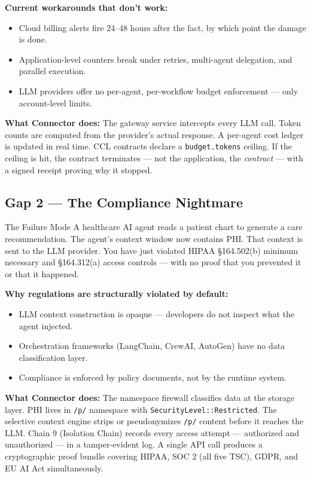 \documentclass[11pt,a4paper]{article}
\begin{document}
\textbf{Current workarounds that don't work:}
\begin{itemize}
  \item Cloud billing alerts fire 24--48 hours after the fact, by which point the damage is done.
  \item Application-level counters break under retries, multi-agent delegation, and parallel execution.
  \item LLM providers offer no per-agent, per-workflow budget enforcement — only account-level limits.
\end{itemize}

\textbf{What Connector does:} The gateway service intercepts every LLM call. Token counts are computed from
the provider's actual response. A per-agent cost ledger is updated in real time. CCL contracts declare a
\texttt{budget.tokens} ceiling. If the ceiling is hit, the contract terminates — not the application, the
\emph{contract} — with a signed receipt proving why it stopped.

\subsection{Gap 2 — The Compliance Nightmare}

\begin{dangerbox}{The Failure Mode}
A healthcare AI agent reads a patient chart to generate a care recommendation. The agent's context window
now contains PHI. That context is sent to the LLM provider. You have just violated HIPAA §164.502(b)
minimum necessary and §164.312(a) access controls — with no proof that you prevented it or that it happened.
\end{dangerbox}

\textbf{Why regulations are structurally violated by default:}
\begin{itemize}
  \item LLM context construction is opaque — developers do not inspect what the agent injected.
  \item Orchestration frameworks (LangChain, CrewAI, AutoGen) have no data classification layer.
  \item Compliance is enforced by policy documents, not by the runtime system.
\end{itemize}

\textbf{What Connector does:} The namespace firewall classifies data at the storage layer.
PHI lives in \texttt{/p/} namespace with \texttt{SecurityLevel::Restricted}. The selective context engine
strips or pseudonymizes \texttt{/p/} content before it reaches the LLM. Chain 9 (Isolation Chain) records
every access attempt — authorized and unauthorized — in a tamper-evident log. A single API call produces
a cryptographic proof bundle covering HIPAA, SOC 2 (all five TSC), GDPR, and EU AI Act simultaneously.
\end{document}
